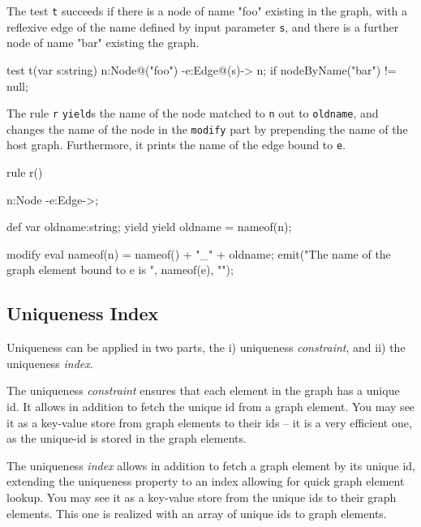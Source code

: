 \begin{example}
The test \texttt{t} succeeds if there is a node of name "foo" existing in the graph, with a reflexive edge of the name defined by input parameter \texttt{s}, and there is a further node of name "bar" existing the graph.

\begin{grgen}
test t(var s:string) {
  n:Node{@("foo")} -e:Edge{@(s)}-> n;
  if{ nodeByName("bar") != null; }
}
\end{grgen}

The rule \texttt{r} \texttt{yield}s the name of the node matched to \texttt{n} out to \texttt{oldname}, and changes the name of the node in the \texttt{modify} part by prepending the name of the host graph. Furthermore, it prints the name of the edge bound to \texttt{e}.

\begin{grgen}
rule r() {
  n:Node -e:Edge->;

  def var oldname:string;
  yield { yield oldname = nameof(n); }
		
  modify {
    eval {
      nameof(n) = nameof() + "_" + oldname;
    }
    emit("The name of the graph element bound to e is ", nameof(e), "\n");
  }
}
\end{grgen}

\end{example}


\subsection{Uniqueness Index}\label{sec:uniqueness}
Uniqueness can be applied in two parts, the i) uniqueness \emph{constraint}, and ii) the uniqueness \emph{index}.

The uniqueness \emph{constraint} ensures that each element in the graph has a unique id. 
It allows in addition to fetch the unique id from a graph element.
You may see it as a key-value store from graph elements to their ids -- it is a very efficient one, as the unique-id is stored in the graph elements. 

The uniqueness \emph{index} allows in addition to fetch a graph element by its unique id, extending the uniqueness property to an index allowing for quick graph element lookup.
You may see it as a key-value store from the unique ids to their graph elements.
This one is realized with an array of unique ids to graph elements.

